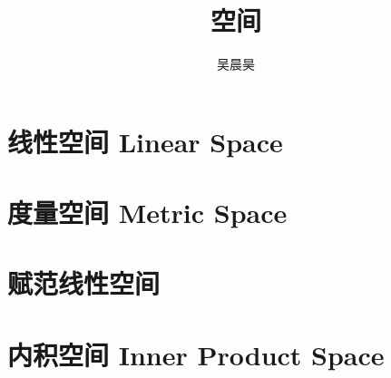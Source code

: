 \documentclass[UTF8]{ctexart}
\title{空间}
\author{吴晨昊}
\begin{document}
\maketitle
\thispagestyle{fancy} %

    

\section{线性空间 Linear Space}
    
    \clearpage

\section{度量空间 Metric Space}
    

\section{赋范线性空间}

\section{内积空间 Inner Product Space}
    
\end{document}
